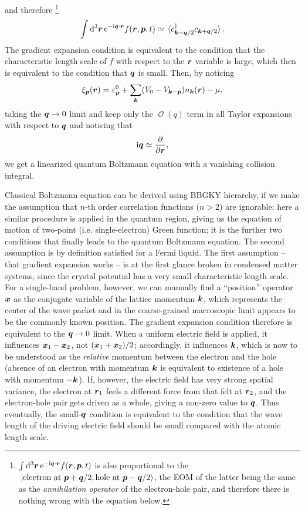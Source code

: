 \documentclass[hyperref, a4paper]{article}
\newcommand*{\ii}{\mathrm{i}}
\newcommand*{\ee}{\mathrm{e}}
\DeclareMathOperator{\bigO}{\mathcal{O}}
\begin{document}
and therefore%
\footnote{
    $\int \dd[3]{\vb*{r}} \ee^{- \ii \vb*{q} \cdot \vb*{r}} f(\vb*{r}, \vb*{p}, t)$ 
    is also proportional to the 
    $\ket*{\text{electron at $\vb*{p} + \vb*{q} / 2$}, \text{hole at $\vb*{p} - \vb*{q} / 2$}}$,
    the EOM of the latter being the same as 
    the \emph{annihilation operator} of the electron-hole pair,
    and therefore there is nothing wrong with the equation below.
}
\begin{equation}
    \int \dd[3]{\vb*{r}} \ee^{- \ii \vb*{q} \cdot \vb*{r}} f(\vb*{r}, \vb*{p}, t)
    \simeq \expval*{c^\dagger_{\vb*{k} - \vb*{q} / 2} c_{\vb*{k} + \vb*{q} / 2}} .
\end{equation}
The gradient expansion condition is equivalent to the condition that 
the characteristic length scale of $f$ with respect to the $\vb*{r}$ variable is large,
which then is equivalent to the condition that $\vb*{q}$ is small.
Then, by noticing 
\begin{equation}
    \xi_{\vb*{p}}(\vb*{r}) = \varepsilon^0_{\vb*{p}}
    + \sum_{\vb*{k}} (V_{0} - V_{\vb*{k} - \vb*{p}} ) n_{\vb*{k}}(\vb*{r}) - \mu,
    \label{eq:simple-fermi-liquid-xi}
\end{equation}
taking the $\vb*{q} \to 0$ limit and keep only the $\bigO(q)$ term in all Taylor expansions 
with respect to $\vb*{q}$
and noticing that 
\[
    \ii \vb*{q} \simeq \pdv{\vb*{r}},
\]
we get a linearized quantum Boltzmann equation with a vanishing collision integral.

Classical Boltzmann equation can be derived using 
BBGKY hierarchy,
if we make the assumption that $n$-th order correlation functions ($n > 2$) 
are ignorable; 
here a similar procedure is applied in the quantum region, 
giving us the equation of motion 
of two-point (i.e. single-electron) Green function;
it is the further two conditions that
finally leads to the quantum Boltzmann equation.
The second assumption is by definition satisfied for a Fermi liquid.
The first assumption -- that gradient expansion works -- is at the first glance 
broken in condensed matter systems, 
since the crystal potential has a very small characteristic length scale.
For a single-band problem, however, 
we can manually find a ``position'' operator $\vb*{x}$ as the conjugate variable 
of the lattice momentum $\vb*{k}$,
which represents the center of the wave packet 
and in the coarse-grained macroscopic limit 
appears to be the commonly known position.
The gradient expansion condition therefore is equivalent to the $\vb*{q} \to 0$ limit.
When a uniform electric field is applied, 
it influences $\vb*{x}_1 - \vb*{x}_2$, not $(\vb*{x}_1 + \vb*{x}_2) / 2$;
accordingly, it influences $\vb*{k}$, 
which is now to be understood as the \emph{relative} momentum 
between the electron and the hole 
(absence of an electron with momentum $\vb*{k}$ 
is equivalent to existence of a hole with momentum $- \vb*{k}$).
If, however, the electric field has very strong spatial variance, 
the electron at $\vb*{r}_1$ feels a different force 
from that felt at $\vb*{r}_2$,
and the electron-hole pair gets driven as a whole,
giving a non-zero value to $\vb*{q}$.
Thus eventually, 
the small-$\vb*{q}$ condition is equivalent to 
the condition that the wave length of the driving electric field 
should be small compared with the atomic length scale.
\end{document}
